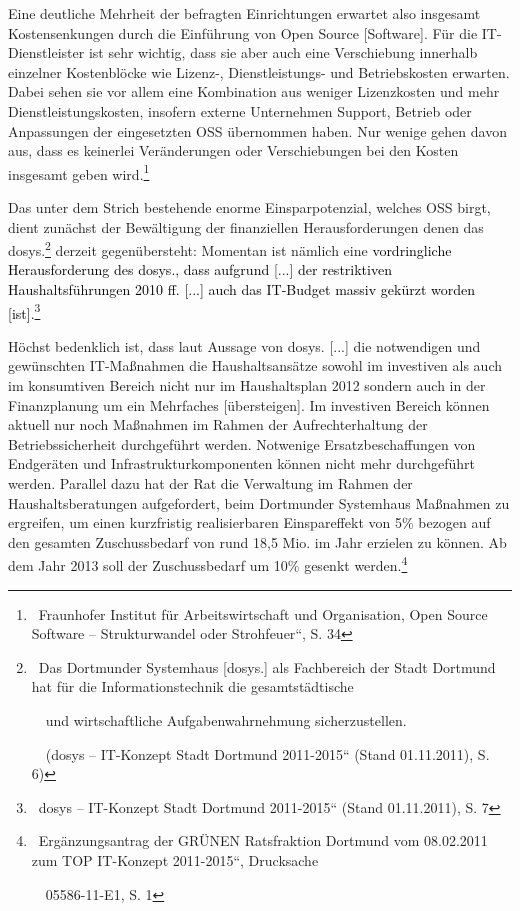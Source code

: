 \documentclass[a4paper]{article}
\begin{document}
{
{\guillemotright}Eine deutliche Mehrheit der befragten Einrichtungen
erwartet also insgesamt Kostensenkungen durch die Einf\"uhrung von Open
Source [Software]. F\"ur die IT-Dienstleister ist sehr wichtig, dass
sie aber auch eine Verschiebung innerhalb einzelner Kostenbl\"ocke wie
Lizenz-, Dienstleistungs- und Betriebskosten erwarten. Dabei sehen sie
vor allem eine Kombination aus weniger Lizenzkosten und mehr
Dienstleistungskosten, insofern externe Unternehmen Support, Betrieb
oder Anpassungen der eingesetzten OSS \"ubernommen haben. Nur wenige
gehen davon aus, dass es keinerlei Ver\"anderungen oder Verschiebungen
bei den Kosten insgesamt geben
wird.{\guillemotleft}\footnote{\ Fraunhofer Institut f\"ur
Arbeitswirtschaft und Organisation, {\quotedblbase}Open Source Software
-- Strukturwandel oder Strohfeuer{\textquotedblleft}, S. 34}}

{
Das unter dem Strich bestehende enorme Einsparpotenzial, welches OSS
birgt, dient zun\"achst der Bew\"altigung der finanziellen
Herausforderungen denen das dosys.\footnote{\ {\guillemotright}Das
Dortmunder Systemhaus [dosys.] als Fachbereich der Stadt Dortmund hat
f\"ur die Informationstechnik die gesamtst\"adtische\par \ \ und
wirtschaftliche Aufgabenwahrnehmung
sicherzustellen.{\guillemotleft}\par \ \ (dosys --
{\quotedblbase}IT-Konzept Stadt Dortmund 2011-2015{\textquotedblleft}
(Stand 01.11.2011), S. 6)} derzeit gegen\"ubersteht: Momentan ist
n\"amlich eine\textcolor{black}{ vordringliche Herausforderung des
dosys., dass aufgrund }{\guillemotright} [...]\textcolor{black}{ der
restriktiven Haushaltsf\"uhrungen 2010 ff. [...] auch das IT-Budget
massiv gek\"urzt worden [ist].}\footnote{\ dosys --
{\quotedblbase}IT-Konzept Stadt Dortmund 2011-2015{\textquotedblleft}
(Stand 01.11.2011), S. 7}}

{
H\"ochst bedenklich ist, dass {\guillemotright}laut Aussage von dosys.
[...] die notwendigen und gew\"unschten IT-Ma{\ss}nahmen die
Haushaltsans\"atze sowohl im investiven als auch im konsumtiven Bereich
nicht nur im Haushaltsplan 2012 sondern auch in der Finanzplanung um
ein Mehrfaches [\"ubersteigen]. Im investiven Bereich k\"onnen aktuell
nur noch Ma{\ss}nahmen im Rahmen der Aufrechterhaltung der
Betriebssicherheit durchgef\"uhrt werden. Notwenige Ersatzbeschaffungen
von Endger\"aten und Infrastrukturkomponenten k\"onnen nicht mehr
durchgef\"uhrt werden. Parallel dazu hat der Rat die Verwaltung im
Rahmen der Haushaltsberatungen aufgefordert, beim Dortmunder Systemhaus
Ma{\ss}nahmen zu ergreifen, um einen kurzfristig realisierbaren
Einspareffekt von 5\% bezogen auf den gesamten Zuschussbedarf von rund
18,5 Mio. {\texteuro} im Jahr erzielen zu k\"onnen. Ab dem Jahr 2013
soll der Zuschussbedarf um 10\% gesenkt
werden.{\guillemotleft}\footnote{\ Erg\"anzungsantrag der GR\"UNEN
Ratsfraktion Dortmund vom 08.02.2011 zum TOP {\quotedblbase}IT-Konzept
2011-2015{\textquotedblleft}, Drucksache\par \ \ 05586-11-E1, S. 1}}
\end{document}
